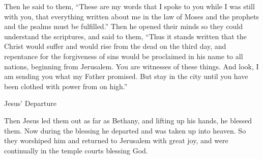 {\par }{\PP {}Then
he said
to
them,
“These
are my
words
that
I spoke
to
you
while
I was
still
with
you,
that
everything
written
about
me
in
the law
of Moses
and
the prophets
and
the psalms
must
be fulfilled.”
Then
he opened
their
minds
so they could understand
the scriptures,
and
said
to them,
“Thus
it stands written
that the Christ
would suffer
and
would rise
from
the dead
on the third
day,
and
repentance
for
the forgiveness
of sins
would be proclaimed
in
his
name
to
all
nations,
beginning
from
Jerusalem.
You
are witnesses
of these things.
And
look,
I
am sending
you
what my
Father
promised.
But
stay
in
the city
until
you have been clothed
with power
from
on high.”
\par }{\SH Jesus’ Departure
\par }{\PP {}Then
Jesus led
them
out
as far as
Bethany,
and
lifting up
his
hands,
he blessed
them.
Now during the blessing
he departed
and
was taken up
into
heaven.
So
they
worshiped
him
and returned
to
Jerusalem
with
great
joy,
and
were
continually
in
the temple courts
blessing
God.
\par }